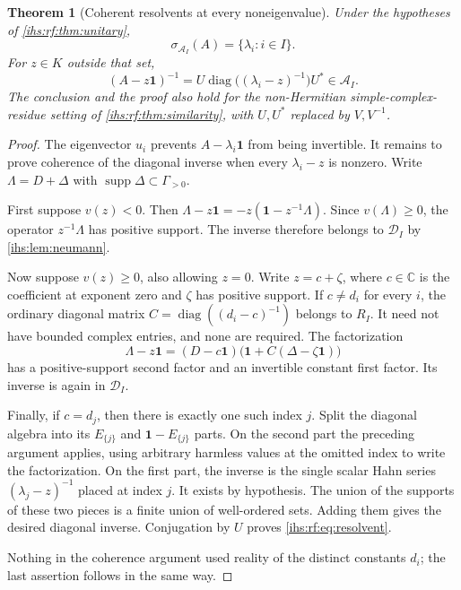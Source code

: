 \documentclass[11pt,a4paper]{article}
\numberwithin{equation}{section}
\newtheorem{theorem}{Theorem}[section]
\theoremstyle{definition}
\theoremstyle{remark}
\newcommand{\C}{\mathbb C}
\newcommand{\K}{K}
\newcommand{\Arf}{\mathcal A_I}
\newcommand{\Dg}{\mathcal D_I}
\newcommand{\supp}{\operatorname{supp}}
\newcommand{\diag}{\operatorname{diag}}
\newcommand{\Id}{\mathbf 1}
\begin{document}
\begin{theorem}[Coherent resolvents at every noneigenvalue]\label{ihs:rf:thm:resolvent}
Under the hypotheses of \cref{ihs:rf:thm:unitary},
\begin{equation}\label{ihs:rf:eq:spectrum}
 \sigma_{\Arf}(A)=\{\lambda_i:i\in I\}.
\end{equation}
For $z\in\K$ outside that set,
\begin{equation}\label{ihs:rf:eq:resolvent}
 (A-z\Id)^{-1}=U\diag\bigl((\lambda_i-z)^{-1}\bigr)U^*\in\Arf.
\end{equation}
The conclusion and the proof also hold for the non-Hermitian
simple-complex-residue setting of \cref{ihs:rf:thm:similarity}, with
$U,U^*$ replaced by $V,V^{-1}$.
\end{theorem}
\begin{proof}
The eigenvector $u_i$ prevents $A-\lambda_i\Id$ from being invertible. It
remains to prove coherence of the diagonal inverse when every
$\lambda_i-z$ is nonzero. Write $\Lambda=D+\Delta$ with
$\supp\Delta\subset\Gamma_{>0}$.

First suppose $v(z)<0$. Then $\Lambda-z\Id=-z(\Id-z^{-1}\Lambda)$. Since
$v(\Lambda)\ge0$, the operator $z^{-1}\Lambda$ has positive support. The
inverse therefore belongs to $\Dg$ by \cref{ihs:lem:neumann}.

Now suppose $v(z)\ge0$, also allowing $z=0$. Write $z=c+\zeta$, where
$c\in\C$ is the coefficient at exponent zero and $\zeta$ has positive
support. If $c\ne d_i$ for every $i$, the ordinary diagonal matrix
$C=\diag((d_i-c)^{-1})$ belongs to $R_I$. It need not have bounded complex
entries, and none are required. The factorization
\[
 \Lambda-z\Id=(D-c\Id)\bigl(\Id+C(\Delta-\zeta\Id)\bigr)
\]
has a positive-support second factor and an invertible constant first
factor. Its inverse is again in $\Dg$.

Finally, if $c=d_j$, then there is exactly one such index $j$. Split the
diagonal algebra into its $E_{\{j\}}$ and $\Id-E_{\{j\}}$ parts. On the
second part the preceding argument applies, using arbitrary harmless values
at the omitted index to write the factorization. On the first part, the
inverse is the single scalar Hahn series $(\lambda_j-z)^{-1}$ placed at
index $j$. It exists by hypothesis. The union of the supports of these two
pieces is a finite union of well-ordered sets. Adding them gives the desired
diagonal inverse. Conjugation by $U$ proves \eqref{ihs:rf:eq:resolvent}.

Nothing in the coherence argument used reality of the distinct constants
$d_i$; the last assertion follows in the same way.
\end{proof}
\end{document}
